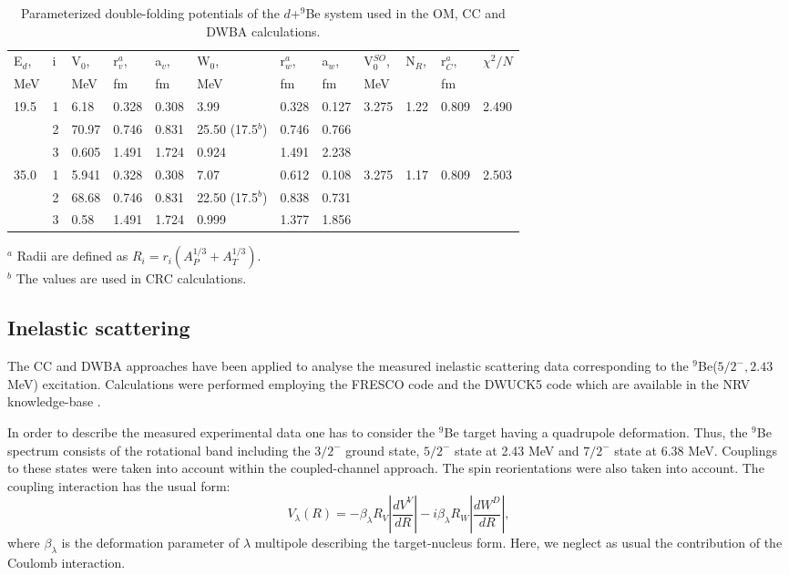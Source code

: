 \documentclass[
12pt, %
oneside, %
english, %
onehalfspacing, %
onehalfspacing, %
headsepline, %
]{MastersDoctoralThesis} %
\begin{document}
\begin{table*}[bp]
\footnotesize
\caption{\label{dbe_potpar} \footnotesize Parameterized double-folding potentials of the $d$+$^9$Be system used in the OM, CC and DWBA calculations.}
\begin{tabular*}{\textwidth}{ll@{\extracolsep{\fill}}llllllllll}
\toprule
E$_d$, & i & V$_0$, & r$_v^{a}$, & a$_v$, & W$_0$, & r$_w^{a}$, & a$_w$, & V$_0^{SO}$, & N$_R$, & r$_C^{a}$, & $\chi^2/N$ \\
MeV   &   & MeV   & fm    & fm    & MeV   & fm    & fm    & MeV        &       & fm   						& \\ \midrule
19.5  & 1 & 6.18  & 0.328 & 0.308 & 3.99  & 0.328 & 0.127 & 3.275      & 1.22  & 0.809 			& 	2.490	\\
      & 2 & 70.97 & 0.746 & 0.831 & 25.50 (17.5$^{b}$) & 0.746 & 0.766 &            &       &    						&   \\
      & 3 & 0.605 & 1.491 & 1.724 & 0.924 & 1.491 & 2.238 &            &       &   							&    \\ \midrule
35.0  & 1 & 5.941 & 0.328 & 0.308 & 7.07  & 0.612 & 0.108 & 3.275      & 1.17  & 0.809 			&	2.503\\
      & 2 & 68.68 & 0.746 & 0.831 & 22.50 (17.5$^{b}$)& 0.838 & 0.731 &            &       &       						&\\
      & 3 & 0.58  & 1.491 & 1.724 & 0.999 & 1.377 & 1.856 &            &       &      							& \\ \bottomrule
\end{tabular*}
\scriptsize
$^{a}$ Radii are defined as $R_i = r_i \left( A^{1/3}_P+A^{1/3}_T \right)$.  \\
$^{b}$ The values are used in CRC calculations. \\
\end{table*}


\subsection{Inelastic scattering}
The CC and DWBA approaches have been applied to analyse the measured inelastic scattering data corresponding to the ${}^9$Be($5/2^-, 2.43$ MeV) excitation. Calculations were performed employing the FRESCO code \cite{fresco} and the DWUCK5 code \cite{kunz} which are available in the NRV knowledge-base \cite{nrv}.

In order to describe the measured experimental data one has to consider the ${}^9$Be target having a quadrupole deformation. Thus, the ${}^9$Be spectrum consists of the rotational band including the  $3/2^-$ ground state, $5/2^-$ state at 2.43 MeV and $7/2^-$ state at 6.38 MeV. Couplings to these states were taken into account within the coupled-channel approach. The spin reorientations were also taken into account. The coupling interaction has the usual form:
\begin{equation}
V_\lambda(R)=-\beta_\lambda R_V \left|\frac{d V^V}{dR}\right| - i \beta_\lambda R_W \left|\frac{d W^D}{dR}\right|,
\end{equation}
where $\beta_\lambda$ is the deformation parameter of $\lambda$ multipole describing the target-nucleus form. Here, we neglect as usual the contribution of the Coulomb interaction.
\end{document}
